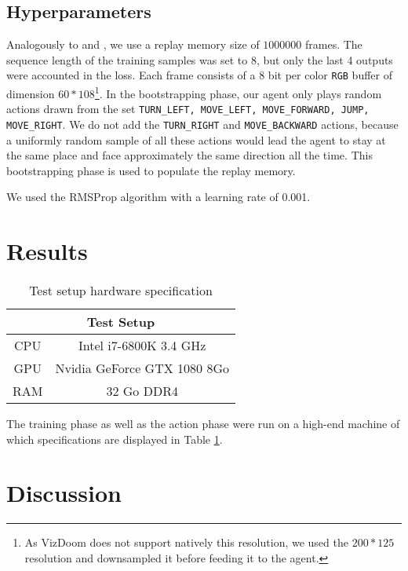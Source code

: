 \documentclass[letterpaper]{article}
\newcommand\Tstrut{\rule{0pt}{2.6ex}}
\begin{document}
\subsection{Hyperparameters}
Analogously to \cite{Mnih2015} and \cite{Lample2016}, we use a replay memory
size of $1000000$ frames. The sequence length of
the training samples was set to 8, but only the last 4 outputs were accounted
in the loss.
Each frame consists of a 8 bit per color \texttt{RGB} buffer of dimension
$60 * 108$\footnote{As VizDoom does not support natively this resolution, we
used the $200 * 125$ resolution and downsampled it before feeding it to the
agent.}.
In the bootstrapping phase, our agent only plays random actions drawn from the
set \texttt{TURN\_LEFT, MOVE\_LEFT, MOVE\_FORWARD, JUMP, MOVE\_RIGHT}. We do
not add the \texttt{TURN\_RIGHT} and \texttt{MOVE\_BACKWARD} actions, because
a uniformly random sample of all these actions would lead the agent to stay
at the same place and face approximately the same direction all the time. This
bootstrapping phase is used to populate the replay memory.

We used the RMSProp algorithm with a learning rate of 0.001.

\section{Results}
\begin{table}[h]
\centering
\begin{tabular}{cc}
\multicolumn{2}{c}{Test Setup}                         \Tstrut\\ \hline
\multicolumn{1}{c|}{CPU} & Intel i7-6800K 3.4 GHz      \Tstrut\\
\multicolumn{1}{c|}{GPU} & Nvidia GeForce GTX 1080 8Go \Tstrut\\
\multicolumn{1}{c|}{RAM} & 32 Go DDR4                      \Tstrut
\end{tabular}
\caption{Test setup hardware specification}
\label{tab:specs}
\end{table}

The training phase as well as the action phase were run on a high-end machine
of which specifications are displayed in Table \ref{tab:specs}.

\section{Discussion}


\footnotesize


\end{document}

